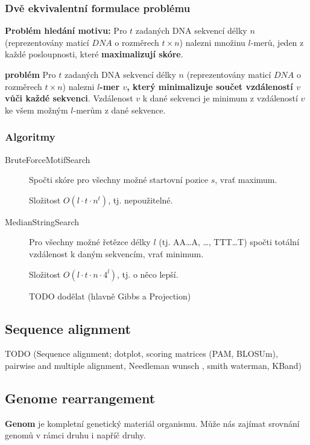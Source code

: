 \documentclass[11pt]{report} %
\numberwithin{equation}{section}
\begin{document}
\subsubsection{Dvě ekvivalentní formulace problému}

\textbf{Problém hledání motivu:} Pro $t$ zadaných DNA sekvencí délky $n$ (reprezentovány maticí $DNA$ o rozměrech $t\times n$) nalezni množinu $l$-merů, jeden z každé posloupnosti, které \textbf{maximalizují skóre}.

\textbf{ problém} Pro $t$ zadaných DNA sekvencí délky $n$ (reprezentovány maticí $DNA$ o rozměrech $t\times n$) nalezni \textbf{$l$-mer $v$, který minimalizuje součet vzdáleností $v$ vůči každé sekvenci}. Vzdálenost $v$ k dané sekvenci je minimum z vzdáleností $v$ ke všem možným $l$-merům z dané sekvence.

\subsubsection{Algoritmy}
\begin{description}
	\item[BruteForceMotifSearch] Spočti skóre pro všechny možné startovní pozice $s$, vrať maximum. 
	
	Složitost $O(l\cdot t \cdot n^t)$, tj. nepoužitelné.
	
	\item[MedianStringSearch] Pro všechny možné řetězce délky $l$ (tj. AA\dots A, \dots, TTT\dots T) spočti totální vzdálenost k daným sekvencím, vrať minimum.
	
	Složitost $O(l\cdot t \cdot n \cdot 4^l)$, tj. o něco lepší.
	
	TODO dodělat (hlavně Gibbs a Projection)
\end{description}




\subsection{Sequence alignment}
TODO (Sequence alignment; dotplot, scoring matrices (PAM, BLOSUm), pairwise and multiple alignment, Needleman wunsch , smith waterman, KBand)

\subsection{Genome rearrangement}
\textbf{Genom} je kompletní genetický materiál organismu. Může nás zajímat srovnání genomů v rámci druhu i napříč druhy.
\end{document}
